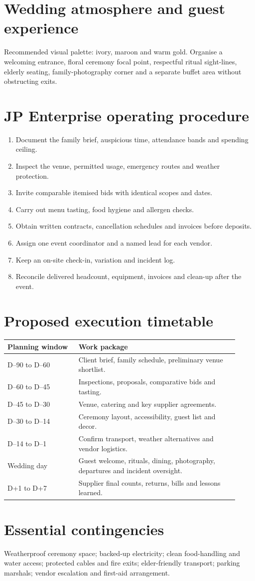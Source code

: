 \section{Wedding atmosphere and guest experience}
Recommended visual palette: ivory, maroon and warm gold. Organise a welcoming entrance, floral ceremony focal point, respectful ritual sight-lines, elderly seating, family-photography corner and a separate buffet area without obstructing exits.

\section{JP Enterprise operating procedure}
\begin{enumerate}
\item Document the family brief, auspicious time, attendance bands and spending ceiling.
\item Inspect the venue, permitted usage, emergency routes and weather protection.
\item Invite comparable itemised bids with identical scopes and dates.
\item Carry out menu tasting, food hygiene and allergen checks.
\item Obtain written contracts, cancellation schedules and invoices before deposits.
\item Assign one event coordinator and a named lead for each vendor.
\item Keep an on-site check-in, variation and incident log.
\item Reconcile delivered headcount, equipment, invoices and clean-up after the event.
\end{enumerate}

\section{Proposed execution timetable}
\begin{longtable}{p{0.29\linewidth}p{0.63\linewidth}}
\toprule
\textbf{Planning window} & \textbf{Work package}\\\midrule
D--90 to D--60 & Client brief, family schedule, preliminary venue shortlist.\\
D--60 to D--45 & Inspections, proposals, comparative bids and tasting.\\
D--45 to D--30 & Venue, catering and key supplier agreements.\\
D--30 to D--14 & Ceremony layout, accessibility, guest list and decor.\\
D--14 to D--1 & Confirm transport, weather alternatives and vendor logistics.\\
Wedding day & Guest welcome, rituals, dining, photography, departures and incident oversight.\\
D+1 to D+7 & Supplier final counts, returns, bills and lessons learned.\\
\bottomrule
\end{longtable}

\section{Essential contingencies}
Weatherproof ceremony space; backed-up electricity; clean food-handling and water access; protected cables and fire exits; elder-friendly transport; parking marshals; vendor escalation and first-aid arrangement.
